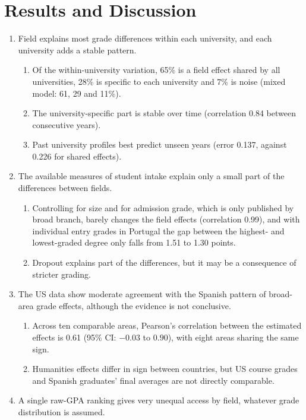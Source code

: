 \documentclass[clean]{bam-outline}
\begin{document}
\section{Results and Discussion}
\begin{enumerate}[resume]
\item Field explains most grade differences within each university, and each university adds a stable pattern.
  \begin{enumerate}
  \item Of the within-university variation, 65\% is a field effect shared by all universities, 28\% is specific to each university and 7\% is noise (mixed model: 61, 29 and 11\%).
  \item The university-specific part is stable over time (correlation 0.84 between consecutive years).
  \item Past university profiles best predict unseen years (error 0.137, against 0.226 for shared effects).
  \end{enumerate}
\item The available measures of student intake explain only a small part of the differences between fields.
  \begin{enumerate}
  \item Controlling for size and for admission grade, which is only published by broad branch, barely changes the field effects (correlation 0.99), and with individual entry grades in Portugal the gap between the highest- and lowest-graded degree only falls from 1.51 to 1.30 points.
  \item Dropout explains part of the differences, but it may be a consequence of stricter grading.
  \end{enumerate}
\item The US data show moderate agreement with the Spanish pattern of broad-area grade effects, although the evidence is not conclusive.
  \begin{enumerate}
  \item Across ten comparable areas, Pearson's correlation between the estimated effects is 0.61 (95\% CI: $-0.03$ to $0.90$), with eight areas sharing the same sign.
  \item Humanities effects differ in sign between countries, but US course grades and Spanish graduates' final averages are not directly comparable.
  \end{enumerate}
\item A single raw-GPA ranking gives very unequal access by field, whatever grade distribution is assumed.

\end{enumerate}
\end{document}
